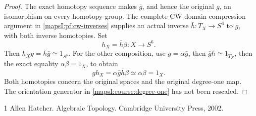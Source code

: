 \documentclass[11pt]{article}
\begin{document}
\begin{proof}
The exact homotopy sequence makes \(\bar g\), and hence the original
\(g\), an isomorphism on every homotopy group.  The complete CW-domain
compression argument in \cref{mapsI:pf:cw-inverses} supplies an actual
inverse \(\bar h:T_X\to S^6\) to \(\bar g\), with both inverse
homotopies.  Set
\[
 h_X=\bar h\beta:X\longrightarrow S^6.
\]
Then \(h_Xg=\bar h\bar g\simeq1_{S^6}\).  For the other composition,
use \(g=\alpha\bar g\), then \(\bar g\bar h\simeq1_{T_X}\), then
the exact equality \(\alpha\beta=1_X\), to obtain
\[
 gh_X=\alpha\bar g\bar h\beta\simeq\alpha\beta=1_X.
\]
Both homotopies concern the original spaces and the original degree-one
map.  The orientation generator in \eqref{mapsI:course:degree-one}
has not been rescaled.
\end{proof}
\begin{thebibliography}{1}
 Allen Hatcher. Algebraic Topology. Cambridge University Press, 2002.
\end{thebibliography}
\end{document}
